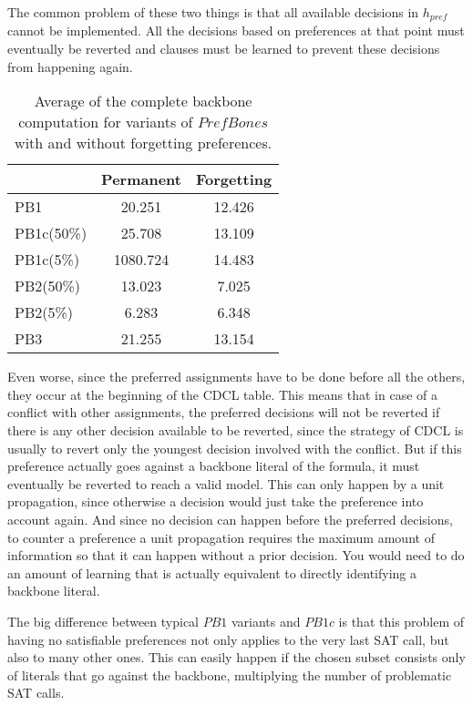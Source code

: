 The common problem of these two things is that all available decisions in $h_{pref}$ cannot be implemented. All the decisions based on preferences at that point must eventually be reverted and clauses must be learned to prevent these decisions from happening again.

\begin{wraptable}[14]{r}{7cm} %
\begin{tabular}{l| c c }
 & Permanent & Forgetting  \\
\hline
PB1 &	20.251 & 12.426 \\
PB1c(50\%) & 25.708 & 13.109 \\
PB1c(5\%) & 1080.724 & 14.483 \\
PB2(50\%) & 13.023 & 7.025 \\
PB2(5\%) & 6.283 & 6.348 \\
PB3 & 21.255 & 13.154 \\
\end{tabular}
\caption{Average of the complete backbone computation for variants of $PrefBones$ with and without forgetting preferences.}
\label{tab:satCompForgettingBenefits}
\end{wraptable}

Even worse, since the preferred assignments have to be done before all the others, they occur at the beginning of the CDCL table. This means that in case of a conflict with other assignments, the preferred decisions will not be reverted if there is any other decision available to be reverted, since the strategy of CDCL is usually to revert only the youngest decision involved with the conflict. But if this preference actually goes against a backbone literal of the formula, it must eventually be reverted to reach a valid model. This can only happen by a unit propagation, since otherwise a decision would just take the preference into account again. And since no decision can happen before the preferred decisions, to counter a preference a unit propagation requires the maximum amount of information so that it can happen without a prior decision. You would need to do an amount of learning that is actually equivalent to directly identifying a backbone literal. 


The big difference between typical $PB1$ variants and $PB1c$ is that this problem of having no satisfiable preferences not only applies to the very last SAT call, but also to many other ones. This can easily happen if the chosen subset consists only of literals that go against the backbone, multiplying the number of problematic SAT calls. 






